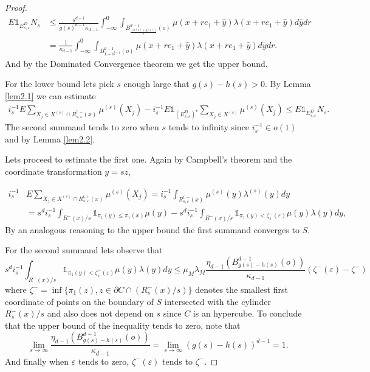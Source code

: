 \begin{proof}
\begin{align}
E\mathds{1}_{E^{D}_{s,\varepsilon}}N_s&\leq\frac{s^{d-1}}{g(s)^{d-1}\kappa_{d-1}}\int_{-\infty}^0\int_{B^{d-1}_{\frac{(h(s)+g(s))}{s}}(o)}\mu(x+re_1+\hat{y})\lambda(x+re_1+\hat{y})d\bar{y}dr\nonumber\\
&=\frac{1}{\kappa_{d-1}}\int_{-\infty}^0\int_{B^{d-1}_{1+s^{\xi-1}}(o)}\mu(x+re_1+\hat{y})\lambda(x+re_1+\hat{y})d\bar{y}dr.\nonumber
\end{align} 
And by the Dominated Convergence theorem we get the upper bound.

For the lower bound lets pick $s$ enough large that $g(s)-h(s)>0$. By Lemma \ref{lem2.1} we can estimate
\begin{align}
 i_s^{-1}E\sum_{X_j\in X^{(s)}\cap R^{l,-}_{s,\varepsilon}(x)}\mu^{(s)}(X_j) -i_s^{-1}E\mathds{1}_{(E^{D}_{s,\varepsilon})^c}\sum_{X_j\in X^{(s)}}\mu^{(s)}(X_j)\leq E\mathds{1}_{E^{D}_{s,\varepsilon}}N_s\nonumber.
 \end{align} 
The second summand tends to zero when $s$ tends to infinity since $i_s^{-1}\in o(1)$ and by Lemma \ref{lem2.2}. 

Lets proceed to estimate the first one. Again by Campbell's theorem and the coordinate transformation $y=sz$,

 \begin{align}
 i_s^{-1}&E\sum_{X_j\in X^{(s)}\cap R^{l,+}_{s,\varepsilon}(x)}\mu^{(s)}(X_j)
=i_s^{-1}\int_{R^{l,-}_{s,\varepsilon}(x)}\mu^{(s)}(y)\lambda^{(s)}(y)dy\nonumber\\
 &=s^{d}i_s^{-1}\int_{R^{-}(x)/s}\mathds{1}_{\pi_1(y)\leq\pi_1(x)}\mu(y)-s^{d}i_s^{-1}\int_{R^{-}(x)/s}\mathds{1}_{\pi_1(y)<\zeta_s^-(\varepsilon)}\mu(y)\lambda(y)dy\nonumber,
 \end{align}
By an analogous reasoning to the upper bound the first summand converges to $S$. 

For the second summand lets observe that
\small
 $$s^d i_s^{-1}\int_{R^{-}(x)/s}\mathds{1}_{\pi_1(y)<\zeta_s^-(\varepsilon)}\mu(y)\lambda(y)dy\leq \mu_M \lambda_M\frac{\eta_{d-1}(B^{d-1}_{g(s)-h(s)}(o))}{\kappa_{d-1}}(\zeta^-(\varepsilon)-\zeta^-) $$
\normalsize
where $\zeta^-=\inf \lbrace\pi_1(z), z\in \partial C\cap(R^-_s(x)/s)\rbrace$ denotes the smallest first coordinate of points on the boundary of $S$ intersected with the cylinder $R_s^-(x)/s$ and also does not depend on $s$ since $C$ is an hypercube. To conclude that the upper bound of the inequality tends to zero, note that 
$$\lim_{s\rightarrow\infty}\frac{\eta_{d-1}(B^{d-1}_{g(s)-h(s)}(o))}{\kappa_{d-1}}=\lim_{s\rightarrow\infty}(g(s)-h(s))^{d-1}=1. $$ And finally when $\varepsilon$ tends to zero, $\zeta^-(\varepsilon)$ tends to $\zeta^-$. 


\end{proof}
